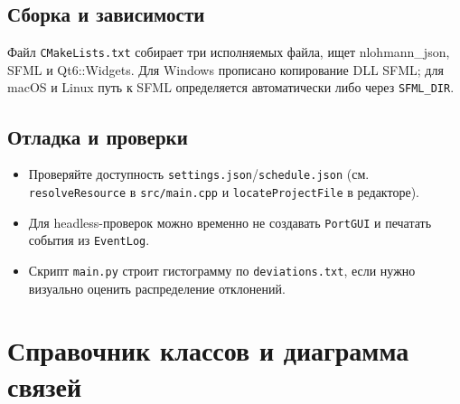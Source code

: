 \documentclass[12pt,a4paper]{article}
\begin{document}
\subsection{Сборка и зависимости}
Файл \verb|CMakeLists.txt| собирает три исполняемых файла, ищет nlohmann\_json, SFML и Qt6::Widgets. Для Windows прописано копирование DLL SFML; для macOS и Linux путь к SFML определяется автоматически либо через \verb|SFML_DIR|.

\subsection{Отладка и проверки}
\begin{itemize}[noitemsep]
    \item Проверяйте доступность \verb|settings.json|/\verb|schedule.json| (см. \verb|resolveResource| в \verb|src/main.cpp| и \verb|locateProjectFile| в редакторе).
    \item Для headless-проверок можно временно не создавать \texttt{PortGUI} и печатать события из \texttt{EventLog}.
    \item Скрипт \verb|main.py| строит гистограмму по \verb|deviations.txt|, если нужно визуально оценить распределение отклонений.
\end{itemize}

\section{Справочник классов и диаграмма связей}
\end{document}
